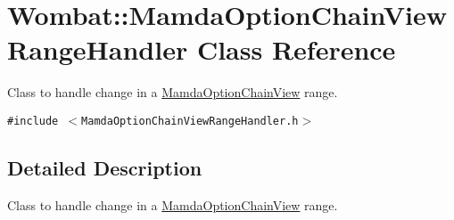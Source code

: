 \hypertarget{classWombat_1_1MamdaOptionChainViewRangeHandler}{
\section{Wombat::Mamda\-Option\-Chain\-View\-Range\-Handler Class Reference}
\label{classWombat_1_1MamdaOptionChainViewRangeHandler}
}
Class to handle change in a \hyperlink{classWombat_1_1MamdaOptionChainView}{Mamda\-Option\-Chain\-View} range.  


{\tt \#include $<$Mamda\-Option\-Chain\-View\-Range\-Handler.h$>$}



\subsection{Detailed Description}
Class to handle change in a \hyperlink{classWombat_1_1MamdaOptionChainView}{Mamda\-Option\-Chain\-View} range. 

